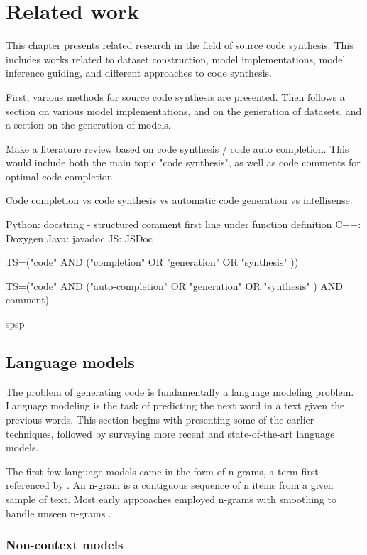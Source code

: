 \chapter{Related work}
\label{chap:related-work}

This chapter presents related research in the field of source code synthesis. This includes works related to dataset construction, model implementations, model inference guiding, and different approaches to code synthesis. 

First, various methods for source code synthesis are presented. Then follows a section on various model implementations, and   on the generation of datasets, and a section on the generation of models.



Make a literature review based on code synthesis / code auto completion. This would include both the main topic "code synthesis", as well as code comments for optimal code completion.

Code completion vs code synthesis vs automatic code generation vs intellisense.

Python: docstring  - structured comment first line under function  definition
C++: Doxygen
Java: javadoc
JS: JSDoc

TS=("code" AND ("completion" OR "generation" OR "synthesis" ))

TS=("code" AND ("auto-completion" OR "generation" OR "synthesis" ) AND comment)

spsp



\section{Language models}
\label{sec:language-models}
The problem of generating code is fundamentally a language modeling problem. Language modeling is the task of predicting the next word in a text given the previous words. This section begins with presenting some of the earlier techniques, followed by surveying more recent and state-of-the-art language models.


The first few language models came in the form of n-grams, a term first referenced by \textcite{shannon1948ngram}. An n-gram is a contiguous sequence of n items from a given sample of text. Most early approaches employed n-grams with smoothing to handle unseen n-grams \textcite{kneser1995improved}.



\subsection{Non-context models}
